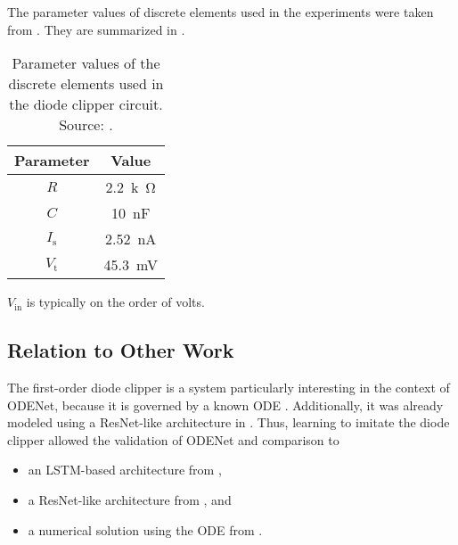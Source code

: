 The parameter values of discrete elements used in the experiments were taken from \cite{Yeh2008}. They are summarized in .

\begin{table}
  \centering
  \caption{Parameter values of the discrete elements used in the diode clipper circuit. Source: \cite{Yeh2008}.}
  \begin{tabular}{c|c}
    \toprule
    \textbf{Parameter} & \textbf{Value} \\
    \midrule
    $R$ & \SI{2.2}{k\ohm} \\
    $C$ & \SI{10}{nF} \\
    $I_\text{s}$ & \SI{2.52}{nA} \\
    $V_\text{t}$ & \SI{45.3}{mV} \\
    \hline
  \end{tabular}
  \label{tab:diode_clipper_element_parameters}
\end{table}

$V_\text{in}$ is typically on the order of volts.

\subsection{Relation to Other Work}

The first-order diode clipper is a system particularly interesting in the context of ODENet, because it is governed by a known \ac{ODE} \cite{Yeh2007,Yeh2008}. Additionally, it was already modeled using a \ac{ResNet}-like architecture in \cite{Parker2019}. Thus, learning to imitate the diode clipper allowed the validation of ODENet and comparison to 
\begin{itemize}
    \item an \ac{LSTM}-based architecture from \cite{Wrightetal2020},
    \item a \ac{ResNet}-like architecture from \cite{Parker2019}, and
    \item a numerical solution using the \ac{ODE} from \cite{Yeh2007,Yeh2008}.
\end{itemize}

